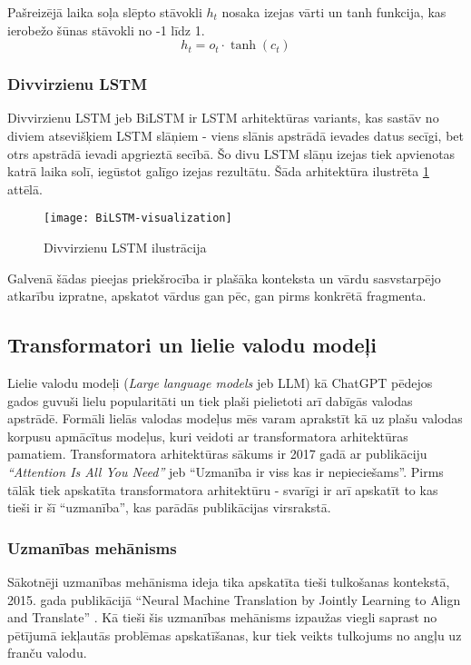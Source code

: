 Pašreizējā laika soļa slēpto stāvokli \(h_t\) nosaka izejas vārti un tanh funkcija, kas ierobežo šūnas stāvokli no -1 līdz 1.
\begin{equation}
h_t = o_t \cdot \tanh(c_t)
\end{equation}

\subsubsection{Divvirzienu LSTM}
Divvirzienu LSTM jeb BiLSTM ir LSTM arhitektūras variants, kas sastāv no diviem atsevišķiem LSTM slāņiem - viens slānis apstrādā ievades datus secīgi, bet otrs apstrādā ievadi apgrieztā secībā. Šo divu LSTM slāņu izejas tiek apvienotas katrā laika solī, iegūstot galīgo izejas rezultātu. Šāda arhitektūra ilustrēta \ref{fig:BiLSTM} attēlā.

\begin{figure}[H]
\texttt{[image: BiLSTM-visualization]}
\caption{Divvirzienu LSTM ilustrācija \cite{BaeldungBiLSTM}}
\label{fig:BiLSTM}
\end{figure}

Galvenā šādas pieejas priekšrocība ir plašāka konteksta un vārdu sasvstarpējo atkarību izpratne, apskatot vārdus gan pēc, gan pirms konkrētā fragmenta.

\subsection{Transformatori un lielie valodu modeļi}
Lielie valodu modeļi (\textit{Large language models} jeb LLM) kā ChatGPT pēdejos gados guvuši lielu popularitāti un tiek plaši pielietoti arī dabīgās valodas apstrādē. Formāli lielās valodas modeļus mēs varam aprakstīt kā uz plašu valodas korpusu apmācītus modeļus, kuri veidoti ar transformatora arhitektūras pamatiem. Transformatora arhitektūras sākums ir 2017 gadā ar publikāciju \textit{“Attention Is All You Need”} \cite{vaswani2023attention} jeb “Uzmanība ir viss kas ir nepieciešams”. Pirms tālāk tiek apskatīta transformatora arhitektūru - svarīgi ir arī apskatīt to kas tieši ir šī “uzmanība”, kas parādās publikācijas virsrakstā.

\subsubsection{Uzmanības mehānisms}
Sākotnēji uzmanības mehānisma ideja tika apskatīta tieši tulkošanas kontekstā, 2015. gada publikācijā “Neural Machine Translation by Jointly Learning to Align and Translate” \cite{bahdanau2016neural}. Kā tieši šis uzmanības mehānisms izpaužas viegli saprast no pētījumā iekļautās problēmas apskatīšanas, kur tiek veikts tulkojums no angļu uz franču valodu.


